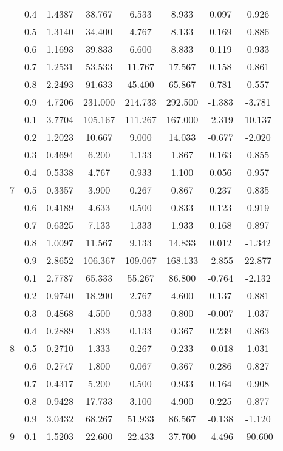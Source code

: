 \documentclass[11pt,a4paper]{report}
\begin{document}
\begin{longtable}{ | c | c || c | c | c | c | c | c | }
 & 0.4 & 1.4387 & 38.767 & 6.533 & 8.933 & 0.097 & 0.926 \\
 & 0.5 & 1.3140 & 34.400 & 4.767 & 8.133 & 0.169 & 0.886 \\
 & 0.6 & 1.1693 & 39.833 & 6.600 & 8.833 & 0.119 & 0.933 \\
 & 0.7 & 1.2531 & 53.533 & 11.767 & 17.567 & 0.158 & 0.861 \\
 & 0.8 & 2.2493 & 91.633 & 45.400 & 65.867 & 0.781 & 0.557 \\
 & 0.9 & 4.7206 & 231.000 & 214.733 & 292.500 & -1.383 & -3.781 \\
 \hline
\multirow{9}{*}{7} & 0.1 & 3.7704 & 105.167 & 111.267 & 167.000 & -2.319 & 10.137 \\
 & 0.2 & 1.2023 & 10.667 & 9.000 & 14.033 & -0.677 & -2.020 \\
 & 0.3 & 0.4694 & 6.200 & 1.133 & 1.867 & 0.163 & 0.855 \\
 & 0.4 & 0.5338 & 4.767 & 0.933 & 1.100 & 0.056 & 0.957 \\
 & 0.5 & 0.3357 & 3.900 & 0.267 & 0.867 & 0.237 & 0.835 \\
 & 0.6 & 0.4189 & 4.633 & 0.500 & 0.833 & 0.123 & 0.919 \\
 & 0.7 & 0.6325 & 7.133 & 1.333 & 1.933 & 0.168 & 0.897 \\
 & 0.8 & 1.0097 & 11.567 & 9.133 & 14.833 & 0.012 & -1.342 \\
 & 0.9 & 2.8652 & 106.367 & 109.067 & 168.133 & -2.855 & 22.877 \\
 \hline
\multirow{9}{*}{8} & 0.1 & 2.7787 & 65.333 & 55.267 & 86.800 & -0.764 & -2.132 \\
 & 0.2 & 0.9740 & 18.200 & 2.767 & 4.600 & 0.137 & 0.881 \\
 & 0.3 & 0.4868 & 4.500 & 0.933 & 0.800 & -0.007 & 1.037 \\
 & 0.4 & 0.2889 & 1.833 & 0.133 & 0.367 & 0.239 & 0.863 \\
 & 0.5 & 0.2710 & 1.333 & 0.267 & 0.233 & -0.018 & 1.031 \\
 & 0.6 & 0.2747 & 1.800 & 0.067 & 0.367 & 0.286 & 0.827 \\
 & 0.7 & 0.4317 & 5.200 & 0.500 & 0.933 & 0.164 & 0.908 \\
 & 0.8 & 0.9428 & 17.733 & 3.100 & 4.900 & 0.225 & 0.877 \\
 & 0.9 & 3.0432 & 68.267 & 51.933 & 86.567 & -0.138 & -1.120 \\
 \hline
\multirow{9}{*}{9} & 0.1 & 1.5203 & 22.600 & 22.433 & 37.700 & -4.496 & -90.600 \\

\end{longtable}
\end{document}
